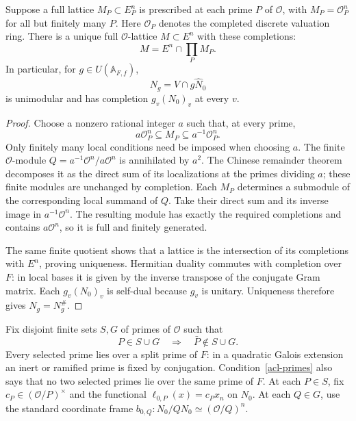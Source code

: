 \begin{lemma}
\label{acl-patching}
Suppose a full lattice $M_P\subset E_P^n$ is prescribed at
each prime $P$ of $\mathcal O$, with $M_P=\mathcal O_P^n$
for all but finitely many $P$. Here $\mathcal O_P$ denotes the
completed discrete valuation ring. There is a unique full
$\mathcal O$-lattice $M\subset E^n$ with these completions:
\[
                         M=E^n\cap\prod_PM_P.
\]
In particular, for $g\in U(\mathbb A_{F,f})$,
\[
                         N_g=V\cap g\widehat N_0
\]
is unimodular and has completion $g_v(N_0)_v$ at every $v$.
\end{lemma}
\begin{proof}
Choose a nonzero rational integer $a$ such that, at every prime,
\[
                 a\mathcal O_P^n\subseteq M_P
                              \subseteq a^{-1}\mathcal O_P^n.
\]
Only finitely many local conditions need be imposed when choosing
$a$. The finite $\mathcal O$-module
$Q=a^{-1}\mathcal O^n/a\mathcal O^n$ is annihilated by $a^2$.
The Chinese remainder theorem decomposes it as the direct sum
of its localizations at the primes dividing $a$; these finite
modules are unchanged by completion. Each $M_P$ determines a
submodule of the corresponding local summand of $Q$. Take their
direct sum and its inverse image in $a^{-1}\mathcal O^n$.
The resulting module has exactly the required completions and
contains $a\mathcal O^n$, so it is full and finitely generated.

The same finite quotient shows that a lattice is the intersection
of its completions with $E^n$, proving uniqueness. Hermitian
duality commutes with completion over $F$: in local bases it is
given by the inverse transpose of the conjugate Gram matrix.
Each $g_v(N_0)_v$ is self-dual because $g_v$ is unitary.
Uniqueness therefore gives $N_g=N_g^\#$.
\end{proof}

Fix disjoint finite sets $S,G$ of primes of $\mathcal O$ such that
\begin{equation}\label{acl-primes}
               P\in S\cup G\quad\Longrightarrow\quad
                                      \bar P\notin S\cup G.
\end{equation}
Every selected prime lies over a split prime of $F$: in a quadratic
Galois extension an inert or ramified prime is fixed by conjugation.
Condition~\eqref{acl-primes} also says that no two selected primes
lie over the same prime of $F$.
At each $P\in S$, fix $c_P\in(\mathcal O/P)^\times$ and the
functional $\ell_{0,P}(x)=c_Px_n$ on $N_0$.
At each $Q\in G$, use the standard coordinate frame
$b_{0,Q}:N_0/QN_0\simeq(\mathcal O/Q)^n$.

